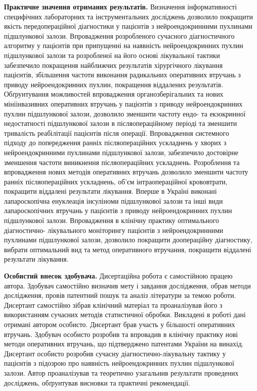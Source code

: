 \textbf{Практичне значення отриманих результатів.} Визначення інформативності специфічних лабораторних та інструментальних досліджень дозволило покращити якість передопераційної діагностики у пацієнтів з нейроендокринними пухлинами підшлункової залози. Впровадження розробленого сучасного діагностичного алгоритму у пацієнтів при припущенні на наявність нейроендокринних пухлин підшлункової залози та розробленої на його основі лікувальної тактики забезпечило покращення найближчих результатів хірургічного лікування пацієнтів, збільшення частоти виконання радикальних оперативних втручань з приводу нейроендокринних пухлин, покращення віддалених результатів.
Обґрунтування можливостей впровадження органозберігальних та нових мініінвазивних оперативних втручань у пацієнтів з приводу нейроендокринних пухлин підшлункової залози, дозволило зменшити частоту ендо- та екзокринної недостатності підшлункової залози в післяопераційному періоді та зменшити тривалість реабілітації пацієнтів після операції.
Впровадження системного підходу до попередження ранніх післяопераційних ускладнень у хворих з нейроендокринними пухлинами підшлункової залози, забезпечило достовірне зменшення частоти виникнення післяопераційних ускладнень.
Розроблення та впровадження нових методів оперативних втручань дозволило зменшити частоту ранніх післяопераційних ускладнень, об’єм інтраопераційної крововтрати, покращити віддалені результати лікування.
Вперше в Україні виконані лапароскопічна енуклеація інсуліноми підшлункової залози та інші види лапароскопічних втручань у пацієнтів з приводу нейроендокринних пухлин підшлункової залози.
Впровадження в клінічну практику оптимального діагностично- лікувального моніторингу пацієнтів з нейроендокринними пухлинами підшлункової залози, дозволило покращити доопераційну діагностику, вибрати оптимальний вид та метод оперативного втручання, покращити віддалені результати лікування.

\textbf{Особистий внесок здобувача.} Дисертаційна робота є самостійною працею автора. Здобувач самостійно визначив мету і завдання дослідження, обрав методи дослідження, провів патентний пошук та аналіз літератури за темою роботи. Дисертант самостійно зібрав клінічний матеріал та проаналізував його з використанням сучасних методів статистичної обробки. Викладені в роботі дані отримані автором особисто. Дисертант брав участь у більшості оперативних втручань.
Здобувач особисто розробив та впровадив в клінічну практику нові методи оперативних втручань, що підтверджено патентами України на винахід.
Дисертант особисто розробив сучасну діагностично-лікувальну тактику у пацієнтів з підозрою про наявність нейроендокринних пухлин підшлункової залози.
Автор проаналізував та теоретично узагальнив результати проведених досліджень, обґрунтував висновки та практичні рекомендації.


